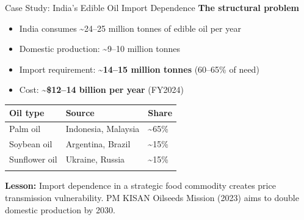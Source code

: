 \documentclass[
  ignorenonframetext,
  aspectratio=169,
]{beamer}
\makeatletter
\providecommand{\tightlist}{%
  \setlength{\itemsep}{0pt}\setlength{\parskip}{0pt}}
\let\quarto@originallabel\label
\DeclareRobustCommand*{\label}[1]{\quarto@originallabel{#1}}
\makeatother
\begin{document}
\begin{frame}{Case Study: India's Edible Oil Import Dependence}
\label{case-study-indias-edible-oil-import-dependence}
\textbf{The structural problem}

\begin{itemize}
\tightlist
\item
  India consumes \textasciitilde24--25 million tonnes of edible oil per
  year
\item
  Domestic production: \textasciitilde9--10 million tonnes
\item
  Import requirement: \textbf{\textasciitilde14--15 million tonnes}
  (60--65\% of need)
\item
  Cost: \textbf{\textasciitilde\$12--14 billion per year} (FY2024)
\end{itemize}

\begin{longtable}[]{@{}lll@{}}
\toprule\noalign{}
Oil type & Source & Share \\
\midrule\noalign{}
\endhead
Palm oil & Indonesia, Malaysia & \textasciitilde65\% \\
Soybean oil & Argentina, Brazil & \textasciitilde15\% \\
Sunflower oil & Ukraine, Russia & \textasciitilde15\% \\
\bottomrule\noalign{}
\end{longtable}

\textbf{Lesson:} Import dependence in a strategic food commodity creates
price transmission vulnerability. PM KISAN Oilseeds Mission (2023) aims
to double domestic production by 2030.

\end{frame}
\end{document}

